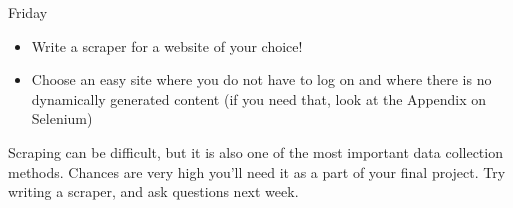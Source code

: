 \documentclass{beamer}
\begin{document}
%
%


\begin{frame}{Friday}


\begin{itemize}
\item Write a scraper for a website of your choice!
\item Choose an easy site where you do not have to log on and where there is no dynamically generated content (if you need that, look at the Appendix on Selenium)
\end{itemize}

\pause

Scraping can be difficult, but it is also one of the most important data collection methods. Chances are very high you'll need it as a part of your final project. Try writing a scraper, and ask questions next week.

\end{frame}


\begin{frame}[plain]{}
\end{frame}
\end{document}
